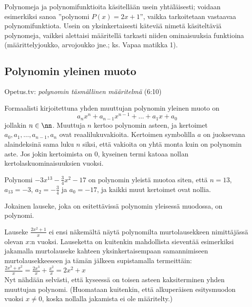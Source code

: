 Polynomeja ja polynomifunktioita käsitellään usein yhtäläisesti; voidaan esimerkiksi sanoa ''polynomi $P(x)=2x+1$'', vaikka tarkoitetaan vastaavaa polynomifunktiota. Usein on yksinkertaisesti kätevää nimetä käsiteltäviä polynomeja, vaikkei alettaisi määritellä tarkasti niiden ominaisuuksia funktioina (määrittelyjoukko, arvojoukko jne.; ks. Vapaa matikka 1).


\subsection*{Polynomin yleinen muoto}

{Opetus.tv: \emph{polynomin täsmällinen määritelmä} (6:10)}

Formaalisti kirjoitettuna yhden muuttujan polynomin yleinen muoto on
\[a_n x^n + a_{n-1} x^{n-1} + \ldots + a_1 x + a_0 \] 
jollakin $n\in\nn$. Muuttuja $n$ kertoo polynomin asteen, ja kertoimet $a_0, a_1, \ldots, a_{n-1}, a_n$ ovat reaalilukuvakioita. Kertoimen symbolilla $a$ on juoksevana alaindeksinä sama luku $n$ siksi, että vakioita on yhtä monta kuin on polynomin aste. Jos jokin kertoimista on $0$, kyseinen termi katoaa nollan kertolaskuominaisuuksien vuoksi.

\begin{esimerkki}

Polynomi $-3x^{13}-\frac{3}{4}x^2-17$ on polynomin yleistä muotoa siten, että $n=13$, $a_{13}=-3$, $a_2=-\frac{3}{4}$ ja $a_0=-17$, ja kaikki muut kertoimet ovat nollia.

\end{esimerkki}
 
Jokainen lauseke, joka on esitettävissä polynomin yleisessä muodossa, on polynomi.

\begin{esimerkki}

Lauseke $\frac{2x^2+1}{x}$ ei ensi näkemältä näytä polynomilta murtolausekkeen nimittäjässä olevan $x$:n vuoksi. Lauseketta on kuitenkin mahdollista sieventää esimerkiksi jakamalla murtolauseke kahteen yksinkertaisempaan samannimiseen murtolausekkeeseen ja tämän jälkeen supistamalla termeittäin: \\

$\frac{2x^3+x^2}{x} = \frac{2x^3}{x}+\frac{x^2}{x} = 2x^2+x $ \\

Nyt nähdään selvästi, että kyseessä on toisen asteen kaksiterminen yhden muuttujan polynomi. (Huomataan kuitenkin, että alkuperäisen esitysmuodon vuoksi $x \neq 0$, koska nollalla jakamista ei ole määritelty.)

\end{esimerkki}

